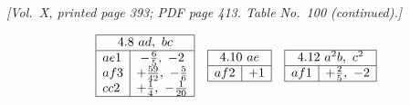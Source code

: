 \documentclass[11pt]{article}
\begin{document}
\medskip

\noindent\textit{[Vol.~X, printed page 393; PDF page 413. Table No.~100 (continued).]}

\[
\begin{array}{|l|c|}\hline
\multicolumn{2}{|c|}{4.8\ ad,\ bc}\\\hline
ae1 & -\tfrac{6}{5},\ -2 \\
af3 & +\tfrac{59}{42},\ -\tfrac{5}{6} \\
cc2 & +\tfrac{1}{4},\ -\tfrac{1}{20} \\\hline
\end{array}\quad
\begin{array}{|l|c|}\hline
\multicolumn{2}{|c|}{4.10\ ae}\\\hline
af2 & +1 \\\hline
\end{array}\quad
\begin{array}{|l|c|}\hline
\multicolumn{2}{|c|}{4.12\ a^{2}b,\ c^{2}}\\\hline
af1 & +\tfrac{2}{5},\ -2 \\\hline
\end{array}
\]

\medskip
\end{document}
